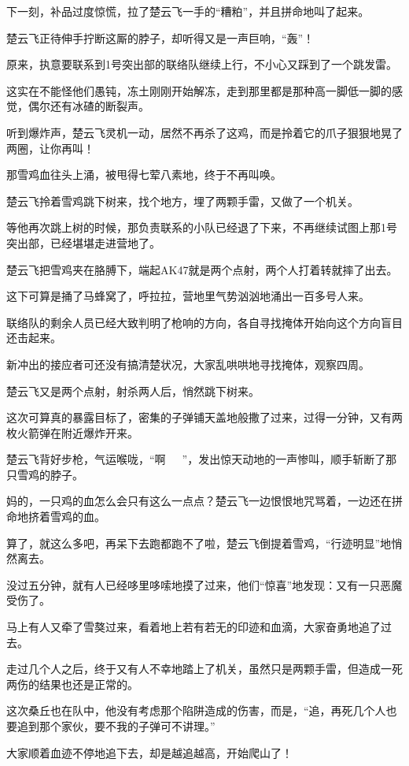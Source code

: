 下一刻，补品过度惊慌，拉了楚云飞一手的“糟粕”，并且拼命地叫了起来。

楚云飞正待伸手拧断这厮的脖子，却听得又是一声巨响，“轰”！

原来，执意要联系到1号突出部的联络队继续上行，不小心又踩到了一个跳发雷。

这实在不能怪他们愚钝，冻土刚刚开始解冻，走到那里都是那种高一脚低一脚的感觉，偶尔还有冰碴的断裂声。

听到爆炸声，楚云飞灵机一动，居然不再杀了这鸡，而是拎着它的爪子狠狠地晃了两圈，让你再叫！

那雪鸡血往头上涌，被甩得七荤八素地，终于不再叫唤。

楚云飞拎着雪鸡跳下树来，找个地方，埋了两颗手雷，又做了一个机关。

等他再次跳上树的时候，那负责联系的小队已经退了下来，不再继续试图上那1号突出部，已经堪堪走进营地了。

楚云飞把雪鸡夹在胳膊下，端起AK47就是两个点射，两个人打着转就摔了出去。

这下可算是捅了马蜂窝了，呼拉拉，营地里气势汹汹地涌出一百多号人来。

联络队的剩余人员已经大致判明了枪响的方向，各自寻找掩体开始向这个方向盲目还击起来。

新冲出的接应者可还没有搞清楚状况，大家乱哄哄地寻找掩体，观察四周。

楚云飞又是两个点射，射杀两人后，悄然跳下树来。

这次可算真的暴露目标了，密集的子弹铺天盖地般撒了过来，过得一分钟，又有两枚火箭弹在附近爆炸开来。

楚云飞背好步枪，气运喉咙，“啊~~~”，发出惊天动地的一声惨叫，顺手斩断了那只雪鸡的脖子。

妈的，一只鸡的血怎么会只有这么一点点？楚云飞一边恨恨地咒骂着，一边还在拼命地挤着雪鸡的血。

算了，就这么多吧，再呆下去跑都跑不了啦，楚云飞倒提着雪鸡，“行迹明显”地悄然离去。

没过五分钟，就有人已经哆里哆嗦地摸了过来，他们“惊喜”地发现：又有一只恶魔受伤了。

马上有人又牵了雪獒过来，看着地上若有若无的印迹和血滴，大家奋勇地追了过去。

走过几个人之后，终于又有人不幸地踏上了机关，虽然只是两颗手雷，但造成一死两伤的结果也还是正常的。

这次桑丘也在队中，他没有考虑那个陷阱造成的伤害，而是，“追，再死几个人也要追到那个家伙，要不我的子弹可不讲理。”

大家顺着血迹不停地追下去，却是越追越高，开始爬山了！


